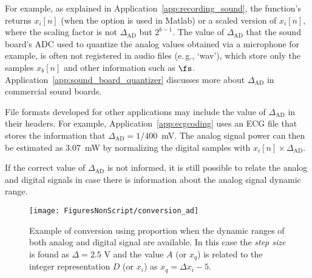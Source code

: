 For example, as explained in Application~\ref{app:recording_sound}, the {\matlab} function's  returns $x_i[n]$ (when the option  is used in Matlab) or a scaled version of $x_i[n]$, where the scaling factor is not $\Delta_{\textrm{AD}}$ but $2^{b-1}$. The value of $\Delta_{\textrm{AD}}$ that the sound board's ADC used to quantize the analog values obtained via a microphone for example, is often not registered in audio files (e.\,g., `wav'), which store only the samples $x_b[n]$ and other information such as $\fs$. Application~\ref{app:sound_board_quantizer} discusses more about $\Delta_{\textrm{AD}}$ in commercial sound boards.

File formats developed for other applications may include the value of $\Delta_{\textrm{AD}}$ in their headers. For example, Application~\ref{app:ecgcoding} uses an ECG file that stores the information that
$\Delta_{\textrm{AD}} = 1/400$~mV. The analog signal power can then be estimated as 3.07~mW by normalizing the digital samples with $x_i[n] \times \Delta_{\textrm{AD}}$.

If the correct value of $\Delta_{\textrm{AD}}$ is not informed, it is still possible to relate the analog and digital signals in case there is information about the analog signal dynamic range.


\begin{figure}
	\centering
		\texttt{[image: FiguresNonScript/conversion\_ad]}
	\caption[Example of conversion using proportion when the dynamic ranges of both analog and digital signal are available]{Example of conversion using proportion when the dynamic ranges of both analog and digital signal are available. In this case the \emph{step size} is found as $\Delta=2.5$ V and the value $A$ (or $x_q$) is related to the integer representation $D$ (or $x_i$) as $x_q=\Delta x_i-5$.\label{fig:conversion_ad}}
\end{figure}

